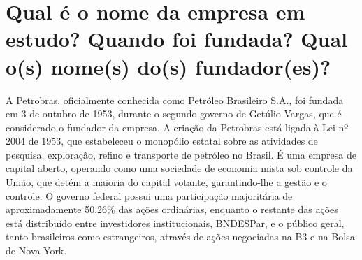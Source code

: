 \section{Qual é o nome da empresa em estudo? Quando foi fundada? Qual o(s) nome(s) do(s) fundador(es)?}

A Petrobras, oficialmente conhecida como Petróleo Brasileiro S.A., foi fundada em 3 de outubro de 1953, durante o segundo governo de Getúlio Vargas, que é considerado o fundador da empresa. A criação da Petrobras está ligada à Lei nº 2004 de 1953, que estabeleceu o monopólio estatal sobre as atividades de pesquisa, exploração, refino e transporte de petróleo no Brasil. É uma empresa de capital aberto, operando como uma sociedade de economia mista sob controle da União, que detém a maioria do capital votante, garantindo-lhe a gestão e o controle. O governo federal possui uma participação majoritária de aproximadamente 50,26\% das ações ordinárias, enquanto o restante das ações está distribuído entre investidores institucionais, BNDESPar, e o público geral, tanto brasileiros como estrangeiros, através de ações negociadas na B3 e na Bolsa de Nova York.
